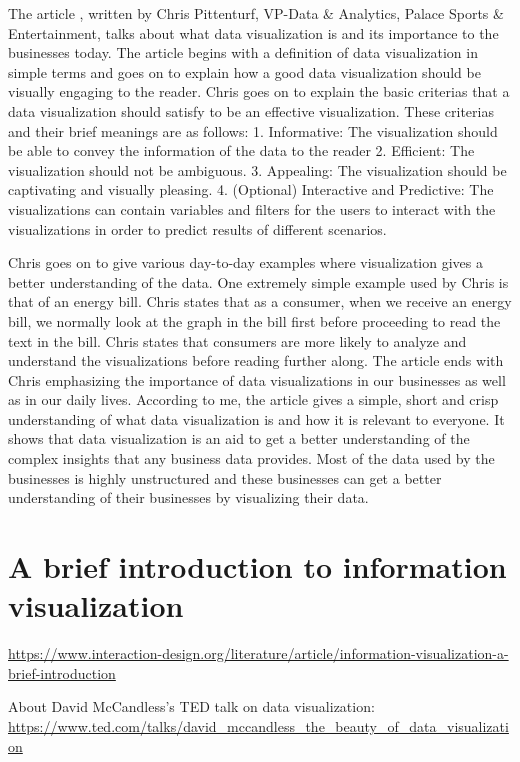 \documentclass[]{book}
\theoremstyle{definition}
\theoremstyle{definition}
\theoremstyle{definition}
\theoremstyle{remark}
\begin{document}
The article , written by Chris Pittenturf, VP-Data \& Analytics, Palace
Sports \& Entertainment, talks about what data visualization is and its
importance to the businesses today. The article begins with a definition
of data visualization in simple terms and goes on to explain how a good
data visualization should be visually engaging to the reader. Chris goes
on to explain the basic criterias that a data visualization should
satisfy to be an effective visualization. These criterias and their
brief meanings are as follows: 1. Informative: The visualization should
be able to convey the information of the data to the reader 2.
Efficient: The visualization should not be ambiguous. 3. Appealing: The
visualization should be captivating and visually pleasing. 4. (Optional)
Interactive and Predictive: The visualizations can contain variables and
filters for the users to interact with the visualizations in order to
predict results of different scenarios.

Chris goes on to give various day-to-day examples where visualization
gives a better understanding of the data. One extremely simple example
used by Chris is that of an energy bill. Chris states that as a
consumer, when we receive an energy bill, we normally look at the graph
in the bill first before proceeding to read the text in the bill. Chris
states that consumers are more likely to analyze and understand the
visualizations before reading further along. The article ends with Chris
emphasizing the importance of data visualizations in our businesses as
well as in our daily lives. According to me, the article gives a simple,
short and crisp understanding of what data visualization is and how it
is relevant to everyone. It shows that data visualization is an aid to
get a better understanding of the complex insights that any business
data provides. Most of the data used by the businesses is highly
unstructured and these businesses can get a better understanding of
their businesses by visualizing their data.

\section{A brief introduction to information
visualization}\label{a-brief-introduction-to-information-visualization}

\url{https://www.interaction-design.org/literature/article/information-visualization-a-brief-introduction}

About David McCandless's TED talk on data visualization:
\url{https://www.ted.com/talks/david_mccandless_the_beauty_of_data_visualization}
\end{document}
